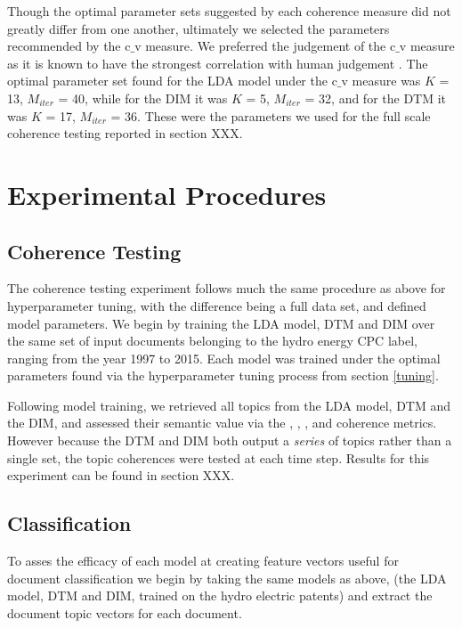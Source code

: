 Though the optimal parameter sets suggested by each coherence measure did not greatly differ from one another, ultimately we selected the parameters recommended by the c$\_$v measure. We preferred the judgement of the c$\_$v measure as it is known to have the strongest correlation with human judgement \parencite{Roder:2015:EST:2684822.2685324}. The optimal parameter set found for the LDA model under the c$\_$v measure was $K$ = 13, $M_{iter}$ = 40, while for the DIM it was $K$ = 5, $M_{iter}$ = 32, and for the DTM it was $K$ = 17, $M_{iter}$ = 36. These were the parameters we used for the full scale coherence testing reported in section XXX.



\section{Experimental Procedures}

\subsection{Coherence Testing}
The coherence testing experiment follows much the same procedure as above for hyperparameter tuning, with the difference being a full data set, and defined model parameters. We begin by training the LDA model, DTM and DIM over the same set of input documents belonging to the  hydro energy CPC label, ranging from the year 1997 to 2015. Each model was trained under the optimal parameters found via the hyperparameter tuning process from section \ref{tuning}. 

Following model training, we retrieved all topics from the LDA model, DTM and the DIM, and assessed their semantic value via the , , , and  coherence metrics. However because the DTM and DIM both output a \emph{series} of topics rather than a single set, the topic coherences were tested at each time step. Results for this experiment can be found in section XXX.

\subsection{Classification}
To asses the efficacy of each model at creating feature vectors useful for document classification we begin by taking the same models as above, (the LDA model, DTM and DIM, trained on the hydro electric patents) and extract the document topic vectors for each document.

